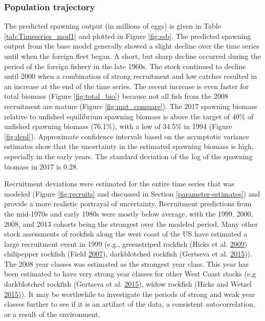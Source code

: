 \documentclass[12pt,]{article}
\begin{document}
\subsubsection{Population trajectory}\label{population-trajectory}

The predicted spawning output (in millions of eggs) is given in Table
\ref{tab:Timeseries_mod1} and plotted in Figure \ref{fig:ssb}. The
predicted spawning output from the base model generally showed a slight
decline over the time series until when the foreign fleet began. A
short, but sharp decline occurred during the period of the foreign
fishery in the late 1960s. The stock continued to decline until 2000
when a combination of strong recruitment and low catches resulted in an
increase at the end of the time series. The recent increase is even
faster for total biomass (Figure \ref{fig:total_bio}) because not all
fish from the 2008 recruitment are mature (Figure
\ref{fig:mat_compare}). The 2017 spawning biomass relative to unfished
equilibrium spawning biomass is above the target of 40\% of unfished
spawning biomass (76.1\%), with a low of 34.5\% in 1994 (Figure
\ref{fig:depl}). Approximate confidence intervals based on the
asymptotic variance estimates show that the uncertainty in the estimated
spawning biomass is high, especially in the early years. The standard
deviation of the log of the spawning biomass in 2017 is 0.28.

Recruitment deviations were estimated for the entire time series that
was modeled (Figure \ref{fig:recruits} and discussed in Section
\ref{parameter-estimates}) and provide a more realistic portrayal of
uncertainty. Recruitment predictions from the mid-1970s and early 1980s
were mostly below average, with the 1999, 2000, 2008, and 2013 cohorts
being the strongest over the modeled period. Many other stock
assessments of rockfish along the west coast of the US have estimated a
large recruitment event in 1999 (e.g., greenstriped rockfish (Hicks et
al. \protect\hyperlink{ref-hicks_status_2009}{2009}) chilipepper
rockfish (Field \protect\hyperlink{ref-field_status_2007}{2007}),
darkblotched rockfish (Gertseva et al.
\protect\hyperlink{ref-gertseva_status_2015}{2015})). The 2008 year
classes was estimated as the strongest year class. This year has been
estimated to have very strong year classes for other West Coast stocks
(e.g darkblotched rockfish (Gertseva et al.
\protect\hyperlink{ref-gertseva_status_2015}{2015}), widow rockfish
(Hicks and Wetzel \protect\hyperlink{ref-hicks_status_2015}{2015})). It
may be worthwhile to investigate the periods of strong and weak year
classes further to see if it is an artifact of the data, a consistent
autocorrelation, or a result of the environment.
\end{document}
